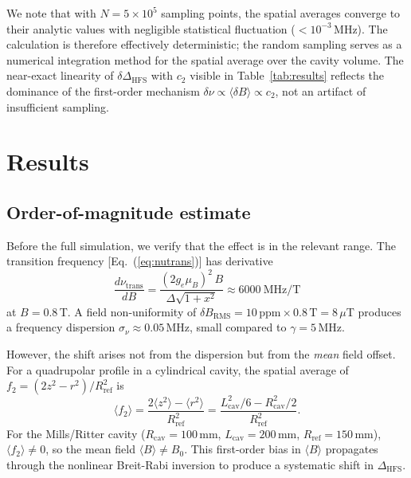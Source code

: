 \documentclass[twocolumn,pra,aps,superscriptaddress,floatfix,10pt]{revtex4-2}
\begin{document}
We note that with $N = 5 \times 10^5$ sampling points, the spatial averages converge to their analytic values with negligible statistical fluctuation ($< 10^{-3}$\,MHz). The calculation is therefore effectively deterministic; the random sampling serves as a numerical integration method for the spatial average over the cavity volume. The near-exact linearity of $\delta\Delta_\mathrm{HFS}$ with $c_2$ visible in Table~\ref{tab:results} reflects the dominance of the first-order mechanism $\delta\nu \propto \langle \delta B \rangle \propto c_2$, not an artifact of insufficient sampling.

\section{Results}
\label{sec:results}

\subsection{Order-of-magnitude estimate}
\label{sec:order_mag}

Before the full simulation, we verify that the effect is in the relevant range. The transition frequency [Eq.~(\ref{eq:nutrans})] has derivative
\begin{equation}
  \frac{d\nu_\mathrm{trans}}{dB} = \frac{(2g_e\mu_B)^2\,B}{\Delta\sqrt{1 + x^2}} \approx 6000~\mathrm{MHz/T}
\end{equation}
at $B = 0.8$\,T. A field non-uniformity of $\delta B_\mathrm{RMS} = 10\,\mathrm{ppm} \times 0.8\,\mathrm{T} = 8\,\mu$T produces a frequency dispersion $\sigma_\nu \approx 0.05$\,MHz, small compared to $\gamma = 5$\,MHz.

However, the shift arises not from the dispersion but from the \emph{mean} field offset. For a quadrupolar profile in a cylindrical cavity, the spatial average of $f_2 = (2z^2 - r^2)/R_\mathrm{ref}^2$ is
\begin{equation}
  \langle f_2 \rangle = \frac{2\langle z^2 \rangle - \langle r^2 \rangle}{R_\mathrm{ref}^2} = \frac{L_\mathrm{cav}^2/6 - R_\mathrm{cav}^2/2}{R_\mathrm{ref}^2}.
  \label{eq:mean_xi}
\end{equation}
For the Mills/Ritter cavity ($R_\mathrm{cav} = 100$\,mm, $L_\mathrm{cav} = 200$\,mm, $R_\mathrm{ref} = 150$\,mm), $\langle f_2 \rangle \neq 0$, so the mean field $\langle B \rangle \neq B_0$. This first-order bias in $\langle B \rangle$ propagates through the nonlinear Breit-Rabi inversion to produce a systematic shift in $\Delta_\mathrm{HFS}$.
\end{document}
